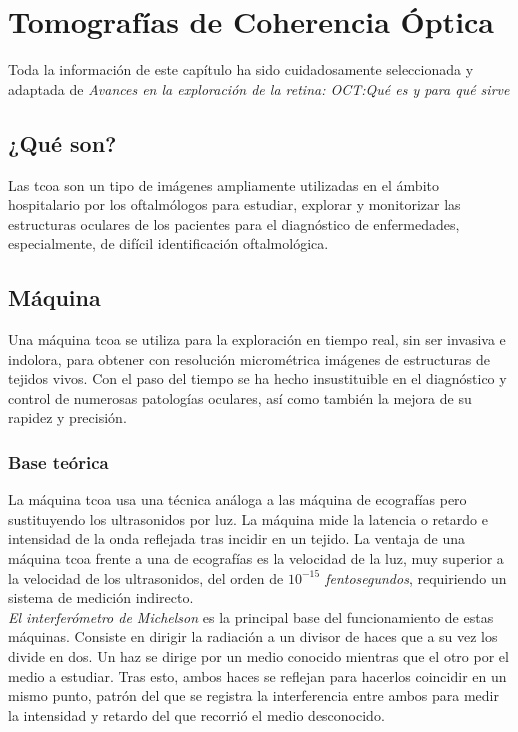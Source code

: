 \chapter{Tomografías de Coherencia Óptica}
Toda la información de este capítulo ha sido cuidadosamente
seleccionada y adaptada de \emph{Avances en la exploración de la
  retina: OCT:\@ Qué es y para qué sirve}\cite{oct-bib}
\section{¿Qué son?}
Las \gls{tcoa} son un tipo de imágenes ampliamente utilizadas en el
ámbito hospitalario por los oftalmólogos para estudiar, explorar y monitorizar las
estructuras oculares de los pacientes para el diagnóstico de
enfermedades, especialmente, de difícil identificación oftalmológica.

\section{Máquina }
Una máquina \gls{tcoa} se utiliza para la exploración en tiempo real, sin ser
invasiva e indolora, para obtener con resolución micrométrica imágenes
de estructuras de tejidos vivos. Con el paso del tiempo se ha hecho
insustituible en el diagnóstico y control de numerosas patologías
oculares, así como también la mejora de su rapidez y precisión.

\subsection{Base teórica}
La máquina \gls{tcoa} usa una técnica análoga a las máquina de
ecografías pero sustituyendo los ultrasonidos por luz. La máquina mide
la latencia o retardo e intensidad de la onda reflejada tras incidir
en un tejido. La ventaja de una máquina \gls{tcoa} frente a una de
ecografías es la velocidad de la luz, muy superior a la velocidad de
los ultrasonidos, del orden de \emph{$10^{-15}$ fentosegundos}, requiriendo un sistema de medición indirecto.\\
\emph{El interferómetro de Michelson} es la principal base del
funcionamiento de estas máquinas. Consiste en dirigir la radiación a
un divisor de haces que a su vez los divide en dos. Un haz se dirige
por un medio conocido mientras que el otro por el medio a
estudiar. Tras esto, ambos haces se reflejan para hacerlos coincidir
en un mismo punto, patrón del que se registra la interferencia entre
ambos para medir la intensidad y retardo del que recorrió el medio
desconocido.

